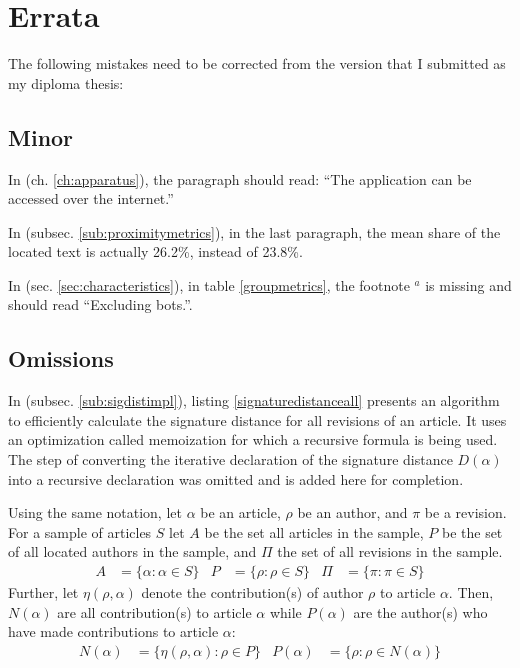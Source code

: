 \chapter{Errata}

The following mistakes need to be corrected from the version that I submitted as my diploma thesis:

\section{Minor}

In  (ch. \ref{ch:apparatus}), the  paragraph should read: ``The application can be accessed over the internet.''

In  (subsec. \ref{sub:proximitymetrics}), in the last paragraph, the mean share of the located text is actually 26.2\%, instead of 23.8\%.

In  (sec. \ref{sec:characteristics}), in table \ref{groupmetrics}, the footnote $^{a}$ is missing and should read ``Excluding bots.''.


\section{Omissions}

In  (subsec. \ref{sub:sigdistimpl}), listing \ref{signaturedistanceall} presents an algorithm to efficiently calculate the signature distance for all revisions of an article.
It uses an optimization called memoization for which a recursive formula is being used. 
The step of converting the iterative declaration of the signature distance $D(\alpha)$ into a recursive declaration was omitted and is added here for completion.

Using the same notation, let $\alpha$ be an article, $\rho$ be an author, and $\pi$ be a revision.
For a sample of articles $S$ let $A$ be the set all articles in the sample, $P$ be the set of all located authors in the sample, and $\Pi$ the set of all revisions in the sample.
\begin{align*}
A &= \{\alpha : \alpha \in S\} &P &= \{\rho : \rho \in S\} & \Pi &= \{\pi : \pi \in S\}
\end{align*}
Further, let $\eta(\rho,\alpha)$ denote the contribution(s) of author $\rho$ to article $\alpha$.
Then, $N(\alpha)$ are all contribution(s) to article $\alpha$ while $P(\alpha)$ are the author(s) who have made contributions to article $\alpha$:
\begin{align*}
N(\alpha) &= \{\eta(\rho,\alpha) : \rho \in P\} & P(\alpha) &= \{\rho : \rho \in N(\alpha)\}
\end{align*}

